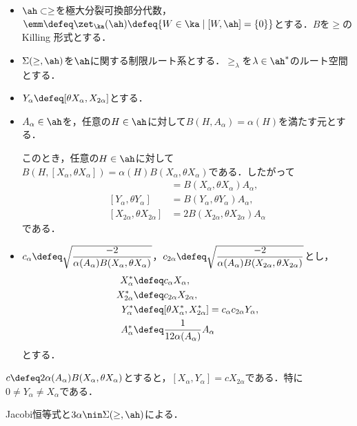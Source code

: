 \begin{nttdef}\label{nttdef:su21-red}
  \leavevmode
  \vspace{-1em}
  \begin{itemize}
  \item $\ah \subset \ge$を極大分裂可換部分代数，$\emm \defeq \zet_{\ka}(\ah) \defeq \{W\in \ka\mid [W,\ah] = \{0\} \} $とする．$B$を$\ge$のKilling 形式とする．
  \item $\Sigma(\ge,\ah) $を$\ah$に関する制限ルート系とする．$\ge_{\lambda} $を$\lambda\in \ah^{*}$のルート空間とする．
  \item $Y_{\alpha}\defeq [\theta X_{\alpha}, X_{2\alpha}] $とする．
  \item $A_{\alpha}\in \ah $を，任意の$H\in \ah$に対して$B(H,A_{\alpha}) = \alpha(H) $を満たす元とする．
    
    このとき，任意の$H\in \ah$に対して$B(H, [X_{\alpha}, \theta X_{\alpha}]) = \alpha(H) B(X_{\alpha}, \theta X_{\alpha}) $である．したがって
      \begin{align*}
        [X_{\alpha}, \theta X_{\alpha}] &= B(X_{\alpha}, \theta X_{\alpha})A_{\alpha} ,\\
        [Y_{\alpha}, \theta Y_{\alpha}] &= B(Y_{\alpha}, \theta Y_{\alpha})A_{\alpha}, \\
        [X_{2\alpha}, \theta X_{2\alpha}] &= 2B(X_{2\alpha}, \theta X_{2\alpha})A_{\alpha} 
      \end{align*}
    である．
    \item $c_{\alpha}\defeq \sqrt{\dfrac{-2}{\alpha(A_{\alpha})B(X_{\alpha}, \theta X_{\alpha})}} $，$ c_{2\alpha}  \defeq \sqrt{\dfrac{-2}{\alpha(A_{\alpha})B(X_{2\alpha}, \theta X_{2\alpha})}} $とし，
      \begin{align*}
        X_{\alpha}^{*} &\defeq c_{\alpha}X_{\alpha}, \\
        X_{2\alpha}^{*} &\defeq c_{2\alpha}X_{2\alpha},\\ 
        Y_{\alpha}^{*} &\defeq [\theta X_{\alpha}^{*}, X_{2\alpha}^{*} ] = c_{\alpha}c_{2\alpha}Y_{\alpha} ,\\
        A_{\alpha}^{*} &\defeq \dfrac{1}{12\alpha(A_{\alpha}) %
      }A_{\alpha} 
      \end{align*}
    とする．
  \end{itemize}
\end{nttdef}

\begin{lem}\label{lem:3.2}
  $c \defeq 2\alpha(A_{\alpha})B(X_{\alpha},\theta X_{\alpha}) $とすると，$[X_{\alpha}, Y_{\alpha}] = cX_{2\alpha} $である．特に$0\neq Y_{\alpha}\neq X_{\alpha} $である．
\end{lem}
\begin{npfwn}
  Jacobi恒等式と$3\alpha\nin \Sigma(\ge,\ah) $による．
\end{npfwn}

